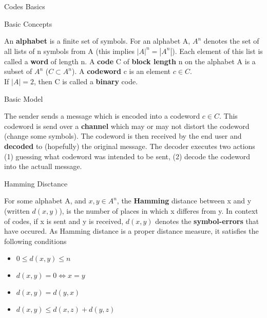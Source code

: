 \documentclass[12pt, letterpaper]{article}
\begin{document}
\begin{section}{Codes Basics}

  \begin{subsection}{Basic Concepts}

    An \textbf{alphabet} is a finite set of symbols. For an alphabet A,
    \(A^{n}\) denotes the set of all lists of n symbols from A (this implies
    \(| A |^{n} = | A^{n} |\)). Each element of this list is called a
    \textbf{word} of length n. A \textbf{code} C of \textbf{block length} n on
    the alphabet A is a subset of \(A^{n}\) (\(C \subset A^{n}\)). A
    \textbf{codeword} c is an element \(c \in C\). \\
    If \(| A | = 2\), then C is called a \textbf{binary} code.

    \begin{subsubsection}{Basic Model}

      The sender sends a message which is encoded into a codeword \(c \in C\).
      This codeword is send over a \textbf{channel} which may or may not
      distort the codeword (change some symbols). The codeword is then received
      by the end user and \textbf{decoded} to (hopefully) the original message.
      The decoder executes two actions (1) guessing what codeword was intended
      to be sent, (2) decode the codeword into the actuall message.

    \end{subsubsection}

    \begin{subsubsection}{Hamming Disctance}

      For some alphabet A, and \(x, y \in A^{n}\), the \textbf{Hamming}
      distance between x and y (written \(d(x, y)\)), is the number of
      places in which x differes from y. In context of codes, if x is sent and
      y is received, \(d(x, y)\) denotes the \textbf{symbol-errors} that
      have occured. As Hamming distance is a proper distance measure, it
      satisfies the following conditions
      \begin{itemize}
        \item \(0 \leq d(x, y) \leq n\)
        \item \(d(x, y) = 0 \iff x = y\)
        \item \(d(x, y) = d(y, x)\)
        \item \(d(x, y) \leq d(x, z) + d(y, z)\)
      \end{itemize}

    \end{subsubsection}


\end{subsection}
\end{section}
\end{document}
